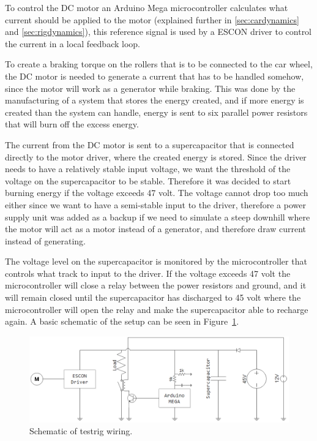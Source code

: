 To control the DC motor an Arduino Mega microcontroller
calculates what current should be applied to the motor (explained further in \ref{sec:cardynamics} and \ref{sec:rigdynamics}), this reference signal
is used by a ESCON driver to control the current in a local feedback loop.

To create a braking torque on the rollers that is to be connected to the car wheel, the DC motor is needed to generate a current
that has to be handled somehow, since the motor will work as
a generator while braking. This was done by the manufacturing of a system that
stores the energy created, and if more energy is created than the system can
handle, energy is sent to six parallel power resistors that will burn off the
excess energy. 

The current from the DC motor is sent to a supercapacitor that is connected
directly to the motor driver, where the created energy is stored. Since the
driver needs to have a relatively stable input voltage, we want the threshold
of the voltage on the supercapacitor to be stable. Therefore it was decided to
start burning energy if the voltage exceeds 47 volt. The voltage cannot drop
too much either since we want to have a semi-stable input to the driver, therefore a power supply unit was added as a backup if we need
to simulate a steep downhill where the motor will act as a motor instead of a
generator, and therefore draw current instead of generating. 

The voltage level on the supercapacitor is monitored by the microcontroller
that controls what track to input to the driver. If the voltage exceeds 47 volt
the microcontroller will close a relay between the power resistors and ground,
and it will remain closed until the supercapacitor has discharged to 45 volt where
the microcontroller will open the relay and make the supercapacitor able to
recharge again. A basic schematic of the setup can be seen in
Figure~\ref{fig:testrig_schematic}.

\begin{figure}[H]
    \centering
    \includegraphics[width=\textwidth]{./img/testrig_schematic.png}
    \caption{Schematic of testrig wiring.}\label{fig:testrig_schematic}
\end{figure}



